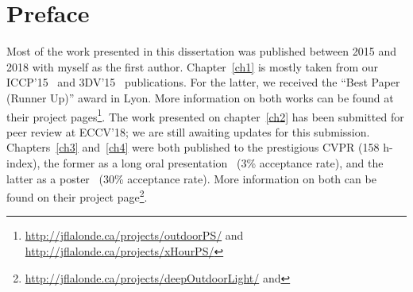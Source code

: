 \chapter*{Preface}         %

Most of the work presented in this dissertation was published between 2015 and 2018 with myself as the first author. %
Chapter~\ref{ch1} is mostly taken from our ICCP'15~\cite{holdgeoffroy-iccp-15} and 3DV'15~\cite{holdgeoffroy-3dv-15} publications. For the latter, we received the ``Best Paper (Runner Up)'' award in Lyon. More information on both works can be found at their project pages\footnote{\url{http://jflalonde.ca/projects/outdoorPS/} and \url{http://jflalonde.ca/projects/xHourPS/}}. The work presented on chapter~\ref{ch2} has been submitted for peer review at ECCV'18; we are still awaiting updates for this submission. Chapters~\ref{ch3} and~\ref{ch4} were both published to the prestigious CVPR (158 h-index), the former as a long oral presentation~\cite{holdgeoffroy-cvpr-17} (3\% acceptance rate), and the latter as a poster~\cite{holdgeoffroy-cvpr-18} (30\% acceptance rate). More information on both can be found on their project page\footnote{\url{http://jflalonde.ca/projects/deepOutdoorLight/} and }.

%
%

